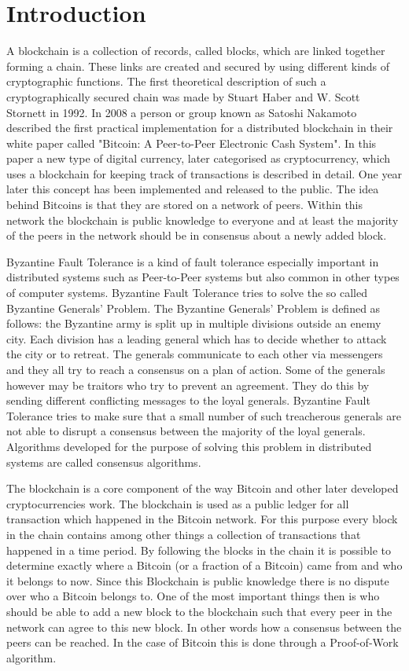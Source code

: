 \section{Introduction}

A blockchain is a collection of records, called blocks, which are linked together forming a chain. These links are created and secured by using different kinds of cryptographic functions.
The first theoretical description of such a cryptographically secured chain was made by Stuart Haber and W. Scott Stornett in 1992.\cite{book:haber} In 2008 a person or group known as Satoshi Nakamoto
described the first practical implementation for a distributed blockchain in their white paper called "Bitcoin: A Peer-to-Peer Electronic Cash System".\cite{url:bitcoin} In this paper a new type of digital
currency, later categorised as cryptocurrency, which uses a blockchain for keeping track of transactions is described in detail. One year later this concept has been implemented and released to the
public. The idea behind Bitcoins is that they are stored on a network of peers. Within this network the blockchain is public knowledge to everyone and at least the majority of the peers in the
network should be in consensus about a newly added block.

Byzantine Fault Tolerance is a kind of fault tolerance especially important in distributed systems such as Peer-to-Peer systems but also common in other types of computer systems.
Byzantine Fault Tolerance tries to solve the so called Byzantine Generals' Problem. The Byzantine Generals' Problem is defined as follows: the Byzantine army is split up in multiple divisions 
outside an enemy city. Each division has a leading general which has to decide whether to attack the city or to retreat. The generals communicate to each other via messengers and they all try to
reach a consensus on a plan of action. Some of the generals however may be traitors who try to prevent an agreement. They do this by sending different conflicting messages to the loyal generals. 
Byzantine Fault Tolerance tries to make sure that a small number of such treacherous generals are not able to disrupt a consensus between the majority of the loyal generals.\cite{url:byzantine_general}
Algorithms developed for the purpose of solving this problem in distributed systems are called consensus algorithms.

The blockchain is a core component of the way Bitcoin and other later developed cryptocurrencies work. The blockchain is used as a public ledger for all transaction which happened in the Bitcoin
network. For this purpose every block in the chain contains among other things a collection of transactions that happened in a time period. By following the blocks in the chain it is possible to
determine exactly where a Bitcoin (or a fraction of a Bitcoin) came from and who it belongs to now. Since this Blockchain is public knowledge there is no dispute over who a Bitcoin belongs to.
One of the most important things then is who should be able to add a new block to the blockchain such that every peer in the network can agree to this new block. In other words how a consensus between
the peers can be reached. In the case of Bitcoin this is done through a Proof-of-Work algorithm.
